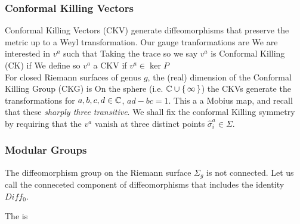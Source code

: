 \documentclass{article}
\begin{document}
\subsubsection*{Conformal Killing Vectors}
Conformal Killing Vectors (CKV) generate diffeomorphisms that preserve the metric up to a Weyl transformation. Our gauge tranformations are 
We are interested in $v^a$ such that 
Taking the trace 
so we say $v^a$ is Conformal Killing (CK) if 
We define 
so $v^a$ a CKV if $v^a \in \ker P$ \\
\newline
For closed Riemann surfaces of genus $g$, the (real) dimension of the Conformal Killing Group (CKG) is 
On the sphere (i.e. $\mathbb{C}\cup\set{\infty}$) the CKVs generate the transformations 
for $a,b,c,d \in \mathbb{C}$, $ad-bc=1$. This a a Mobius map, and recall that these \emph{sharply three transitive}. We shall fix the conformal Killing symmetry by requiring that the $v^a$ vanish at three distinct points $\hat{\sigma}_i^a\in\Sigma$. 

\subsubsection*{Modular Groups}
The diffeomorphism group on the Riemann surface $\Sigma_g$ is not connected. Let us call the conneceted component of diffeomorphisms that includes the identity $Diff_0$. 

\begin{definition}
The  is 
\end{definition}

\begin{example}
\end{example}
\end{document}
